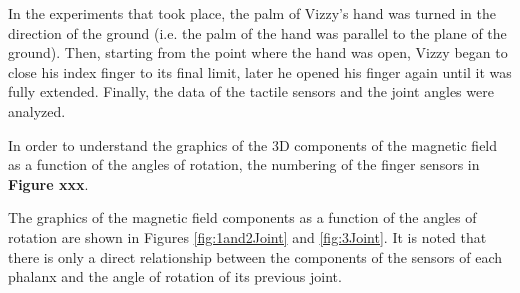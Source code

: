 \par

In the experiments that took place, the palm of Vizzy's hand was turned in the direction of the ground (i.e. the palm of the hand was parallel to the plane of the ground).
Then, starting from the point where the hand was open, Vizzy began to close his index finger to its final limit, later he opened his finger again until it was fully extended.
Finally, the data of the tactile sensors and the joint angles were analyzed.

In order to understand the graphics of the 3D components of the magnetic field as a function of the angles of rotation, the numbering of the finger sensors in \textbf{Figure xxx}.
\par
The graphics of the magnetic field components as a function of the angles of rotation are shown in Figures \ref{fig:1and2Joint} and \ref{fig:3Joint}. It is noted that there is only a direct relationship between the components of the sensors of each phalanx and the angle of rotation of its previous joint.

